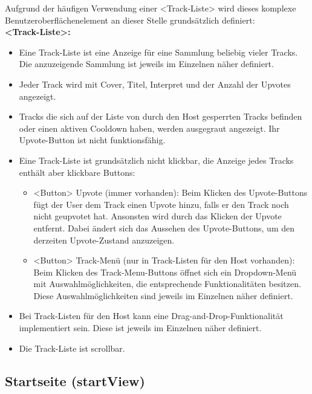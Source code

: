 \documentclass[oneside, ngerman]{sdqtechreport}
\begin{document}
Aufgrund der häufigen Verwendung einer <Track-Liste> wird dieses komplexe Benutzeroberflächenelement an dieser Stelle grundsätzlich definiert:
\vspace{\baselineskip} \\
\textbf{<Track-Liste>:}
\begin{itemize}
    \item Eine Track-Liste ist eine Anzeige für eine Sammlung beliebig vieler Tracks. Die anzuzeigende Sammlung ist jeweils im Einzelnen näher definiert.
    \item Jeder Track wird mit Cover, Titel, Interpret und der Anzahl der Upvotes angezeigt.
    \item Tracks die sich auf der Liste von durch den Host gesperrten Tracks befinden oder einen aktiven Cooldown haben, werden ausgegraut angezeigt. Ihr Upvote-Button ist nicht funktionsfähig.
    \item Eine Track-Liste ist grundsätzlich nicht klickbar, die Anzeige jedes Tracks enthält aber klickbare Buttons:
    \begin{itemize}
        \item <Button> Upvote (immer vorhanden): Beim Klicken des Upvote-Buttons fügt der User dem Track einen Upvote hinzu, falls er den Track noch nicht geupvotet hat. Ansonsten wird durch das Klicken der Upvote entfernt. Dabei ändert sich das Aussehen des Upvote-Buttons, um den derzeiten Upvote-Zustand anzuzeigen.
        \item <Button> Track-Menü (nur in Track-Listen für den Host vorhanden): Beim Klicken des Track-Menu-Buttons öffnet sich ein Dropdown-Menü mit Auswahlmöglichkeiten, die entsprechende Funktionalitäten besitzen. Diese Auswahlmöglichkeiten sind jeweils im Einzelnen näher definiert.
    \end{itemize}
    \item Bei Track-Listen für den Host kann eine Drag-and-Drop-Funktionalität implementiert sein. Diese ist jeweils im Einzelnen näher definiert.
    \item Die Track-Liste ist scrollbar.
\end{itemize}


\subsection{Startseite (startView)}
\label{sec:Benutzeroberfläche:startView}
\end{document}
